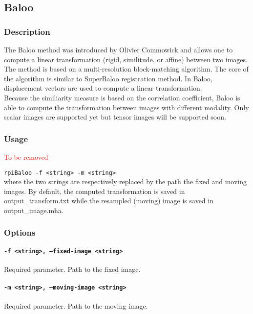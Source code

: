 \subsection{Baloo}



\subsubsection{Description}

The Baloo method was introduced by Olivier Commowick and allows one to compute a linear transformation (rigid, similitude, or affine) between two images.
The method is based on a multi-resolution block-matching algorithm. The core of the algorithm is similar to SuperBaloo registration method. In Baloo, displacement vectors are used to compute a linear transformation.
\\
Because the similiarity measure is based on the correlation coefficient, Baloo is able to compute the transformation between images with different modality. Only scalar images are supported yet but tensor images will be supported soon.


\subsubsection{Usage}

\textcolor{red}{To be removed}

\texttt{rpiBaloo -f <string> -m <string>}\\

\noindent where the two strings are respectively replaced by the path the fixed and moving images.
By default, the computed transformation is saved in output\_transform.txt while the resampled (moving) image is saved in output\_image.mha.


\subsubsection{Options}

\paragraph{\texttt{-f <string>,  --fixed-image <string>}}
Required parameter. Path to the fixed image.

\paragraph{\texttt{-m <string>,  --moving-image <string>}}
Required parameter. Path to the moving image.

